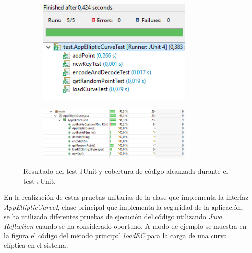 \documentclass[../PFC.tex]{subfiles}
\begin{document}
\begin{figure}[H]
\centering
	\begin{subfigure}{0.4\textwidth}
		\centering
		\includegraphics[width=0.85\textwidth]{./img/junitTest}
    \end{subfigure}          
    \qquad\qquad\qquad  %
    \begin{subfigure}{0.4\textwidth}  
       \centering
       \includegraphics[width=0.85\textwidth]{./img/coveredCode}
    \end{subfigure}   
  \caption{Resultado del test JUnit y cobertura de código alcanzada durante el test JUnit.}
  \label{img:junitTest}
\end{figure}

En la realización de estas pruebas unitarias de la clase que implementa la interfaz \textit{AppEllipticCurveI}, clase principal que implementa la seguridad de la aplicación, se ha utilizado diferentes pruebas de ejecución del código utilizando \textit{Java Reflection}\cite{javaReflection} cuando se ha considerado oportuno. A modo de ejemplo se muestra en la figura el código del método principal \textit{loadEC} para la carga de una curva elíptica en el sistema.
\end{document}

